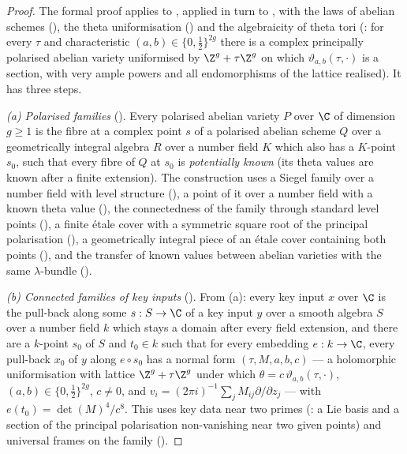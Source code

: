 \begin{proof}
The formal proof applies  to
, applied in turn to , with the
laws of abelian schemes (), the theta uniformisation
() and the algebraicity of theta tori
(: for every $\tau$ and characteristic $(a,b)\in\{0,\frac12\}^{2g}$ there is a
complex principally polarised abelian variety uniformised by $\Z^g+\tau\Z^g$ on which $\vartheta_{a,b}(\tau,\cdot)$ is a
section, with very ample powers and all endomorphisms of the lattice realised). It has three steps.

\emph{(a) Polarised families} (). Every polarised abelian variety $P$ over $\C$ of
dimension $g\ge1$ is the fibre at a complex point $s$ of a polarised abelian scheme $Q$ over a geometrically integral
algebra $R$ over a number field $K$ which also has a $K$-point $s_0$, such that every fibre of $Q$ at $s_0$ is
\emph{potentially known} (its theta values are known after a finite extension). The construction uses a Siegel family
over a number field with level structure (), a point of
it over a number field with a known theta value (),
the connectedness of the family through standard level points
(), a finite \'etale cover with a
symmetric square root of the principal polarisation (),
a geometrically integral piece of an \'etale cover containing both points
(), and the transfer of known values between
abelian varieties with the same $\lambda$-bundle ().

\emph{(b) Connected families of key inputs} (). From (a): every key
input $x$ over $\C$ is the pull-back along some $s:S\to\C$ of a key input $y$ over a smooth algebra $S$ over a number
field $k$ which stays a domain after every field extension, and there are a $k$-point $s_0$ of $S$ and $t_0\in k$ such
that for every embedding $e:k\to\C$, every pull-back $x_0$ of $y$ along $e\circ s_0$ has a normal form
$(\tau,M,a,b,c)$ --- a holomorphic uniformisation with lattice $\Z^g+\tau\Z^g$ under which $\theta=c\,\vartheta_{a,b}(\tau,\cdot)$,
$(a,b)\in\{0,\frac12\}^{2g}$, $c\ne0$, and $v_i=(2\pi i)^{-1}\sum_jM_{ij}\partial/\partial z_j$ --- with
$e(t_0)=\det(M)^4/c^8$. This uses key data near two primes (:
a Lie basis and a section of the principal polarisation non-vanishing near two given points) and universal frames on
the family ().


\end{proof}
